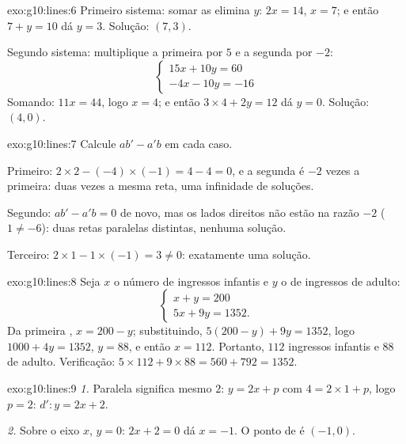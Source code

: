 \begin{solution}{exo:g10:lines:6}
Primeiro sistema: somar as  elimina $y$: $2x = 14$, $x = 7$; e
então $7 + y = 10$ dá $y = 3$. Solução: $(7, 3)$.

Segundo sistema: multiplique a primeira  por $5$ e a segunda por
$-2$:
\[
\begin{cases}
15x + 10y = 60 \\
-4x - 10y = -16
\end{cases}
\]
Somando: $11x = 44$, logo $x = 4$; e então $3 \times 4 + 2y = 12$ dá
$y = 0$. Solução: $(4, 0)$.
\end{solution}

\begin{solution}{exo:g10:lines:7}
Calcule $ab' - a'b$ em cada caso.

Primeiro: $2 \times 2 - (-4) \times (-1) = 4 - 4 = 0$, e a segunda
 é $-2$ vezes a primeira: duas vezes a mesma reta, uma infinidade
de soluções.

Segundo: $ab' - a'b = 0$ de novo, mas os lados direitos não estão na
razão $-2$ ($1 \neq -6$): duas retas paralelas distintas, nenhuma
solução.

Terceiro: $2 \times 1 - 1 \times (-1) = 3 \neq 0$: exatamente uma
solução.
\end{solution}

\begin{solution}{exo:g10:lines:8}
Seja $x$ o número de ingressos infantis e $y$ o de ingressos de adulto:
\[
\begin{cases}
x + y = 200 \\
5x + 9y = 1352 .
\end{cases}
\]
Da primeira , $x = 200 - y$; substituindo,
$5(200 - y) + 9y = 1352$, logo $1000 + 4y = 1352$, $y = 88$, e então
$x = 112$. Portanto, $112$ ingressos infantis e $88$ de adulto.
Verificação: $5 \times 112 + 9 \times 88 = 560 + 792 = 1352$.
\end{solution}

\begin{solution}{exo:g10:lines:9}
\emph{1.} Paralela significa mesmo  $2$:
$y = 2x + p$ com $4 = 2 \times 1 + p$, logo $p = 2$:
$d'\colon y = 2x + 2$.

\emph{2.} Sobre o eixo $x$, $y = 0$: $2x + 2 = 0$ dá $x = -1$. O ponto
de  é $(-1, 0)$.
\end{solution}

